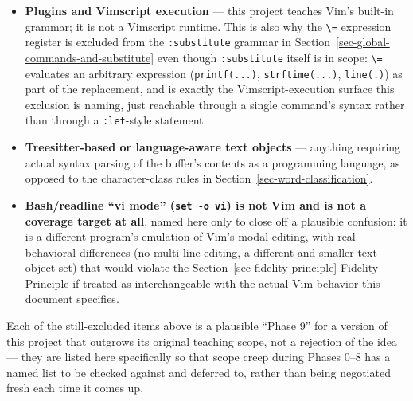 \documentclass[11pt]{article}
\begin{document}
\begin{itemize}
  together in practice: the global-command family
  (\texttt{:g}/\texttt{:global}, \texttt{:v}/\texttt{:g!}/\texttt{:vglobal}) combined with a small fixed set of
  per-line actions (\texttt{d}, \texttt{m}, \texttt{t}/\texttt{co}, \texttt{normal{[}!{]}}), and the substitute
  command (\texttt{:s}, \texttt{:\%s}) with a bounded pattern/replacement grammar that
  explicitly excludes the \texttt{\textbackslash{}=} expression register. These are two named
  additions with their own specification, not a reopening of the
  Ex-command family generally.
\item
  \textbf{Plugins and Vimscript execution} --- this project teaches Vim's built-in
  grammar; it is not a Vimscript runtime. This is also why the \texttt{\textbackslash{}=}
  expression register is excluded from the \texttt{:substitute} grammar in
  Section~\ref{sec-global-commands-and-substitute} even though \texttt{:substitute} itself is in scope: \texttt{\textbackslash{}=} evaluates
  an arbitrary expression (\texttt{printf(...)}, \texttt{strftime(...)}, \texttt{line(\textquotesingle{}.\textquotesingle{})}) as
  part of the replacement, and is exactly the Vimscript-execution surface
  this exclusion is naming, just reachable through a single command's
  syntax rather than through a \texttt{:let}-style statement.
\item
  \textbf{Treesitter-based or language-aware text objects} --- anything requiring
  actual syntax parsing of the buffer's contents as a programming language,
  as opposed to the character-class rules in Section~\ref{sec-word-classification}.
\item
  \textbf{Bash/readline ``vi mode'' (\texttt{set\ -o\ vi}) is not Vim and is not a coverage
  target at all}, named here only to close off a plausible confusion: it
  is a different program's emulation of Vim's modal editing, with real
  behavioral differences (no multi-line editing, a different and smaller
  text-object set) that would violate the Section~\ref{sec-fidelity-principle} Fidelity Principle if
  treated as interchangeable with the actual Vim behavior this document
  specifies.
\end{itemize}

Each of the still-excluded items above is a plausible ``Phase 9'' for a
version of this project that outgrows its original teaching scope, not a
rejection of the idea --- they are listed here specifically so that scope
creep during Phases 0--8 has a named list to be checked against and deferred
to, rather than being negotiated fresh each time it comes up.
\end{document}

